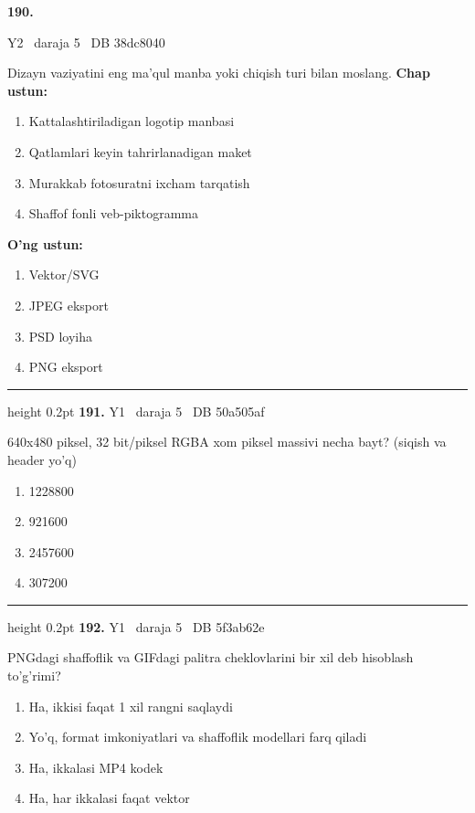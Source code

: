 \documentclass[10pt,a4paper,oneside]{article}
\begin{document}
\hypertarget{q190}{\textbf{\color{ink}190.}}  {\color{muted}\scriptsize Y2 \textbullet\ daraja 5 \textbullet\ DB 38dc8040}
\par
Dizayn vaziyatini eng ma'qul manba yoki chiqish turi bilan moslang.
\textbf{\footnotesize Chap ustun:}
\begin{enumerate}[label=\arabic*),leftmargin=9mm]
\item Kattalashtiriladigan logotip manbasi
\item Qatlamlari keyin tahrirlanadigan maket
\item Murakkab fotosuratni ixcham tarqatish
\item Shaffof fonli veb-piktogramma
\end{enumerate}
\textbf{\footnotesize O'ng ustun:}
\begin{enumerate}[label=\Alph*),leftmargin=9mm]
\item Vektor/SVG
\item JPEG eksport
\item PSD loyiha
\item PNG eksport
\end{enumerate}
\vspace{2mm}\hrule height 0.2pt \vspace{4mm}
\hypertarget{q191}{\textbf{\color{ink}191.}}  {\color{muted}\scriptsize Y1 \textbullet\ daraja 5 \textbullet\ DB 50a505af}
\par
640x480 piksel, 32 bit/piksel RGBA xom piksel massivi necha bayt? (siqish va header yo'q)
\begin{enumerate}[label=\Alph*),leftmargin=9mm]
\item 1228800
\item 921600
\item 2457600
\item 307200
\end{enumerate}
\vspace{2mm}\hrule height 0.2pt \vspace{4mm}
\hypertarget{q192}{\textbf{\color{ink}192.}}  {\color{muted}\scriptsize Y1 \textbullet\ daraja 5 \textbullet\ DB 5f3ab62e}
\par
PNGdagi shaffoflik va GIFdagi palitra cheklovlarini bir xil deb hisoblash to'g'rimi?
\begin{enumerate}[label=\Alph*),leftmargin=9mm]
\item Ha, ikkisi faqat 1 xil rangni saqlaydi
\item Yo'q, format imkoniyatlari va shaffoflik modellari farq qiladi
\item Ha, ikkalasi MP4 kodek
\item Ha, har ikkalasi faqat vektor
\end{enumerate}
\end{document}
